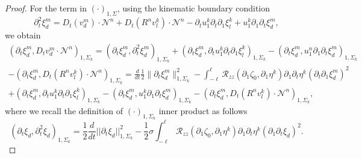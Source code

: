 \documentclass[letterpaper,reqno,10pt,twoside]{amsart}
\theoremstyle{definition}
\theoremstyle{remark}
\def\p{\partial}
\begin{document}
\begin{proof}
		For the term in $(\cdot)_{1,\Sigma}$, using the kinematic boundary condition
		\[
		\partial_{t}^{2}\xi_{d}^{m}=D_{t}(v_{d}^{m})\cdot \mathcal{N}^{n}+D_{t}(R^{n}v_{l}^{k})\cdot \mathcal{N}^{n} - \partial_{t}u_{1}^{k} \partial_{t}\partial_{1}\xi_{l}^{k}+u_{1}^{k}\partial_{1}\partial_{t}\xi_{d}^{m},
		\]
		we obtain
		\[
		\begin{aligned}
			(\partial_{t}\xi_{d}^{m}, D_{t}v_{d}^{m}\cdot\mathcal{N}^{n})_{1,\Sigma_{k}}=(\partial_{t}\xi_{d}^{m},\partial_{t}^{2}\xi_{d}^{m})_{1,\Sigma_{k}} +(\partial_{t}\xi_{d}^{m},\partial_{t}u_{1}^{k} \partial_{t}\partial_{1}\xi_{l}^{k})_{1,\Sigma_{k}}-(\partial_{t}\xi_{d}^{m}, u_{1}^{n}\partial_{1}\partial_{t}\xi_{d}^{m})_{1,\Sigma_{k}}\\
			-(\p_{t}\xi_{d}^{m},D_{t}(R^{n}v_{l}^{k})\cdot \mathcal{N}^{n})_{1,\Sigma_{k}}
			=\frac{d}{dt}\frac12\|\partial_{t}\xi_{d}^{m}\|_{1,\Sigma_{k}}^2-\int_{-\ell}^{\ell}\mathcal{R}_{zz}(\partial_{1}\zeta_{0},\partial_{1}\eta^{k})\partial_{1}\partial_{t}\eta^{k}(\partial_{t}\partial_{1}\xi_{d}^{m})^{2}\\
			+(\partial_{t}\xi_{d}^{m},\partial_{t}u_{1}^{k}\partial_{t}\partial_{1}\xi_{l}^{k})_{1,\Sigma_{k}}-(\partial_{t}\xi_{d}^{m}, u_{1}^{k}\partial_{1}\partial_{t}\xi_{d}^{m})_{1,\Sigma_{k}}
			-(\p_{t}\xi_{d}^{m},D_{t}(R^{n}v_{l}^{k})\cdot \mathcal{N}^{n})_{1,\Sigma_{k}},
		\end{aligned}
		\]
		\noindent where we recall the definition of $(\cdot)_{1,\Sigma_{k}}$ inner product as follows
		\[
		(\partial_{t}\xi_{d},\partial_{t}^{2}\xi_{d})_{1,\Sigma_{k}}=\frac{1}{2}\frac{d}{dt}\vert \vert \partial_{t}\xi_{d}\vert \vert_{1,\Sigma_{k}}^{2}-\frac{1}{2}\sigma\int_{-\ell}^{\ell} \mathcal{R}_{zz}(\partial_{1}\zeta_{0},\partial_{1}\eta^{k}) \partial_{1}\partial_{t}\eta^{k} (\partial_{1}\partial_{t}\xi_{d})^{2}.
		\]
		

\end{proof}
\end{document}
